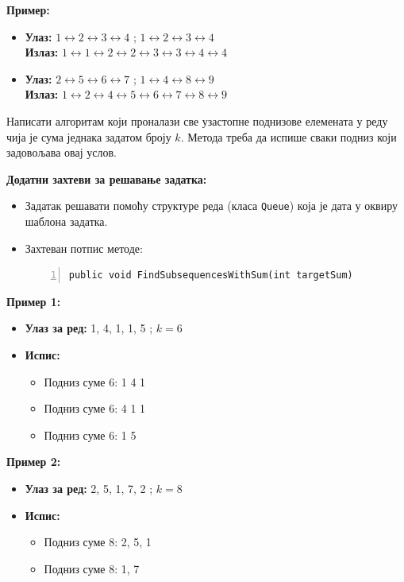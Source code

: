 \textbf{Пример:}
\begin{itemize}
    \item \textbf{Улаз:} $1 \leftrightarrow 2 \leftrightarrow 3 \leftrightarrow 4$  ; \quad $1 \leftrightarrow 2 \leftrightarrow 3 \leftrightarrow 4$ \\
          \textbf{Излаз:} $1 \leftrightarrow 1 \leftrightarrow 2 \leftrightarrow 2 \leftrightarrow 3 \leftrightarrow 3 \leftrightarrow 4 \leftrightarrow 4$
    \item \textbf{Улаз:} $2 \leftrightarrow 5 \leftrightarrow 6 \leftrightarrow 7$ ; \quad $1 \leftrightarrow 4 \leftrightarrow 8 \leftrightarrow 9$ \\
          \textbf{Излаз:} $1 \leftrightarrow 2 \leftrightarrow 4 \leftrightarrow 5 \leftrightarrow 6 \leftrightarrow 7 \leftrightarrow 8 \leftrightarrow 9$
\end{itemize}



Написати алгоритам који проналази све узастопне поднизове елемената у реду чија је сума једнака задатом броју $k$. Метода треба да испише сваки подниз који задовољава овај услов.

\textbf{Додатни захтеви за решавање задатка:}
\begin{itemize}
    \item Задатак решавати помоћу структуре реда (класа \texttt{Queue}) која је дата у оквиру шаблона задатка.
    \item Захтеван потпис методе:
    \begin{Verbatim}[fontsize=\footnotesize, numbers=left, xleftmargin=10mm]
public void FindSubsequencesWithSum(int targetSum)
    \end{Verbatim}
\end{itemize}

\textbf{Пример 1:}
\begin{itemize}
    \item \textbf{Улаз за ред:} 1, 4, 1, 1, 5 ; $k = 6$
    \item \textbf{Испис:}
    \begin{itemize}
        \item Подниз суме 6: 1 4 1
        \item Подниз суме 6: 4 1 1
        \item Подниз суме 6: 1 5
    \end{itemize}
\end{itemize}

\textbf{Пример 2:}
\begin{itemize}
    \item \textbf{Улаз за ред:} 2, 5, 1, 7, 2 ; $k = 8$
    \item \textbf{Испис:}
    \begin{itemize}
        \item Подниз суме 8: 2, 5, 1
        \item Подниз суме 8: 1, 7
    \end{itemize}
\end{itemize}

